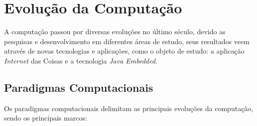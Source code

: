 %

\chapter{Evolução da Computação}

A computação passou por diversas evoluções no último século, devido as 
pesquisas e desenvolvimento em diferentes áreas de estudo, seus resultados veem 
através de novas tecnologias e aplicações, como o objeto de estudo: a aplicação 
\textit{Internet} das Coisas e a tecnologia \textit{Java Embedded}.

\section{Paradigmas Computacionais}

Os paradigmas computacionais delimitam as principais evoluções da computação, 
sendo os principais marcos:

